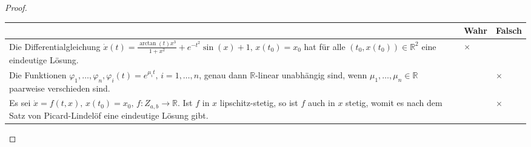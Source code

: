 \begin{proof}
		\begin{tabularx}{\textwidth}{X|p{2cm}|p{2cm}|}
		& Wahr & Falsch \\\hline
		Die Differentialgleichung $\dot{x}(t) = \frac{\arctan(t)x^3}{1 + x^2} + e^{-t^2} \sin(x) + 1, \, x(t_0) = x_0$ hat für alle $(t_0, x(t_0)) \in \mathbb{R}^2$ eine eindeutige Lösung. & $\times$ & \\\hline
		Die Funktionen $\varphi_1, \ldots, \varphi_n, \varphi_i(t) = e^{\mu_i t}, \, i = 1, \ldots, n$, genau dann $\mathbb{R}$-linear unabhängig sind, wenn $\mu_1, \ldots, \mu_n \in \mathbb{R}$ paarweise verschieden sind. & & $\times$\\\hline
		Es sei $\dot{x} = f(t, x), \, x(t_0) = x_0, \, f : Z_{a,b} \to \mathbb{R}$. Ist $f$ in $x$ lipschitz-stetig, so ist $f$ auch in $x$ stetig, womit es nach dem Satz von Picard-Lindelöf eine eindeutige Lösung gibt. & & $\times$ \\\hline
	\end{tabularx}
\end{proof}